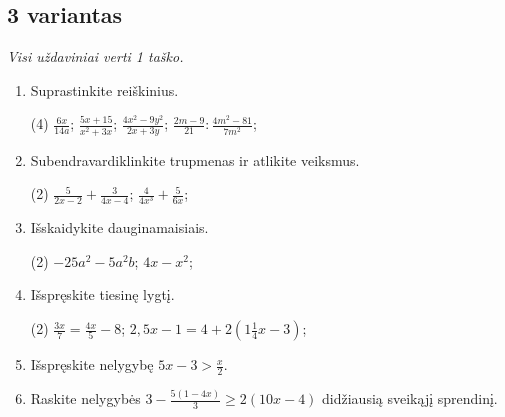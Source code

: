 \documentclass[a4paper]{article}
\begin{document}
\subsection*{3 variantas}

\textit{Visi uždaviniai verti 1 taško.}

\begin{enumerate}
      \item Suprastinkite reiškinius.
            \begin{tasks}[item-format={\normalfont}, after-item-skip=2mm](4)
                  \task $\frac{6x}{14a}$;
                  \task $\frac{5x+15}{x^2+3x}$;
                  \task $\frac{4x^2-9y^2}{2x+3y}$;
                  \task $\frac{2m-9}{21}:\frac{4m^2-81}{7m^2}$;
            \end{tasks}

      \item Subendravardiklinkite trupmenas ir atlikite veiksmus.
            \begin{tasks}[item-format={\normalfont}, after-item-skip=2mm](2)
                  \task $\frac{5}{2x-2}+\frac{3}{4x-4}$;
                  \task $\frac{4}{4x^3}+\frac{5}{6x}$;
            \end{tasks}

      \item Išskaidykite dauginamaisiais.
            \begin{tasks}[item-format={\normalfont}, after-item-skip=2mm](2)
                  \task $-25a^2-5a^2b$;
                  \task $4x-x^2$;
            \end{tasks}

      \item Išspręskite tiesinę lygtį.
            \begin{tasks}[item-format={\normalfont}, after-item-skip=2mm](2)
                  \task $\frac{3x}{7}=\frac{4x}{5}-8$;
                  \task $2,5x-1=4+2(1\frac{1}{4}x-3)$;
            \end{tasks}

      \item Išspręskite nelygybę $5x-3>\frac{x}{2}$.
      \item Raskite nelygybės $3-\frac{5(1-4x)}{3}\geq2(10x-4)$ didžiausią sveikąjį sprendinį.
\end{enumerate}
\end{document}
